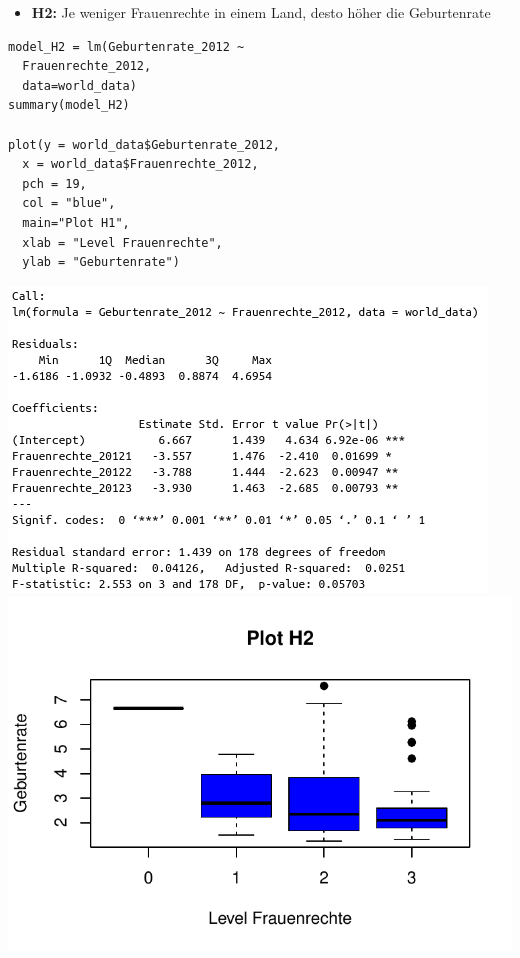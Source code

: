 \documentclass[aspectratio=169, journal, x11names, unknownkeysallowed, hyperref={colorlinks,
linkcolor = SS2,
urlcolor  = F3,
citecolor = F3,
anchorcolor = A4}, 12pt]{beamer}
\begin{document}
  \begin{frame}[t, fragile]
    \begin{minipage}[t]{0.45\textwidth}
        \begin{itemize}
          \item[] \textbf{H2:} Je weniger Frauenrechte in einem Land, desto höher die Geburtenrate
        \end{itemize} 
        \begin{lstlisting}
model_H2 = lm(Geburtenrate_2012 ~ 
  Frauenrechte_2012, 
  data=world_data)
summary(model_H2)

plot(y = world_data$Geburtenrate_2012, 
  x = world_data$Frauenrechte_2012, 
  pch = 19, 
  col = "blue", 
  main="Plot H1", 
  xlab = "Level Frauenrechte", 
  ylab = "Geburtenrate")          
        \end{lstlisting} 
      \end{minipage}%
      \begin{minipage}[t]{0.45\textwidth}
        \vspace{-1em}
        \centering
        \includegraphics[scale=0.3]{../Plots/summary_H2.png}\\

        \includegraphics[scale=0.5]{../Plots/plot_H2.pdf}
      \end{minipage}
  \end{frame}
\end{document}
